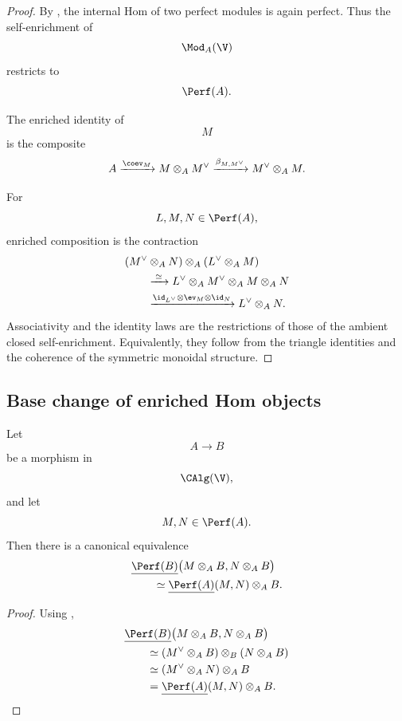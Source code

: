\begin{proof}
By
,
the internal Hom of two perfect modules is again perfect. Thus the
self-enrichment of
\[
    \Mod_A(\V)
\]
restricts to
\[
    \Perf(A).
\]

The enriched identity of
\[
    M
\]
is the composite
\[
    A
    \xrightarrow{\coev_M}
    M\otimes_A M^\vee
    \xrightarrow{\beta_{M,M^\vee}}
    M^\vee\otimes_A M.
\]

For
\[
    L,M,N\in\Perf(A),
\]
enriched composition is the contraction
\[
\begin{aligned}
    &(M^\vee\otimes_A N)
    \otimes_A
    (L^\vee\otimes_A M)
    \\
    &\qquad\xrightarrow{\;\simeq\;}
    L^\vee
    \otimes_A
    M^\vee
    \otimes_A
    M
    \otimes_A
    N
    \\
    &\qquad\xrightarrow{
        \id_{L^\vee}
        \otimes
        \ev_M
        \otimes
        \id_N
    }
    L^\vee\otimes_A N.
\end{aligned}
\]
Associativity and the identity laws are the restrictions of those of the
ambient closed self-enrichment. Equivalently, they follow from the
triangle identities and the coherence of the symmetric monoidal
structure.
\end{proof}


\subsection{Base change of enriched Hom objects}

\begin{proposition}
\label{prop:base-change-enriched-hom}
Let
\[
    A
    \longrightarrow
    B
\]
be a morphism in
\[
    \CAlg(\V),
\]
and let
\[
    M,N\in\Perf(A).
\]
Then there is a canonical equivalence
\[
\begin{aligned}
    &
    \underline{\Perf(B)}
    \bigl(
        M\otimes_A B,
        N\otimes_A B
    \bigr)
    \\
    &\qquad\simeq
    \underline{\Perf(A)}(M,N)
    \otimes_A B.
\end{aligned}
\]
\end{proposition}

\begin{proof}
Using
,
\[
\begin{aligned}
    &
    \underline{\Perf(B)}
    \bigl(
        M\otimes_A B,
        N\otimes_A B
    \bigr)
    \\
    &\qquad\simeq
    (M^\vee\otimes_A B)
    \otimes_B
    (N\otimes_A B)
    \\
    &\qquad\simeq
    (M^\vee\otimes_A N)
    \otimes_A B
    \\
    &\qquad=
    \underline{\Perf(A)}(M,N)
    \otimes_A B.
\end{aligned}
\]
\end{proof}


